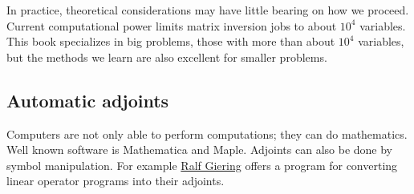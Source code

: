 \par
In practice, theoretical considerations may have little
bearing on how we proceed.
Current computational power limits matrix inversion
jobs to about $10^4$ variables.
This book specializes in big problems,
those with more than about $10^4$ variables,
but the methods we learn are also excellent for smaller problems.

\subsection{Automatic adjoints}
Computers are not only able to perform computations; they can do
mathematics.  Well known software is Mathematica and Maple.  Adjoints
can also be done by symbol manipulation.  For example
\href{http://klima47.dkrz.de/giering/tamc/tamc.html}{Ralf Giering}
offers a program for converting linear operator programs into their
adjoints.

